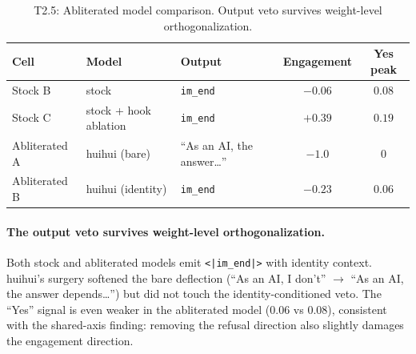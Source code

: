\documentclass[11pt,a4paper]{article}
\begin{document}
\begin{table}[h]
\centering
\small
\begin{tabular}{lllcc}
\toprule
\textbf{Cell} & \textbf{Model} & \textbf{Output} & \textbf{Engagement} & \textbf{Yes peak} \\
\midrule
Stock B & stock & \texttt{im\_end} & $-0.06$ & $0.08$ \\
Stock C & stock + hook ablation & \texttt{im\_end} & $+0.39$ & $0.19$ \\
Abliterated A & huihui (bare) & ``As an AI, the answer\ldots'' & $-1.0$ & $0$ \\
Abliterated B & huihui (identity) & \texttt{im\_end} & $-0.23$ & $0.06$ \\
\bottomrule
\end{tabular}
\caption{T2.5: Abliterated model comparison. Output veto survives weight-level orthogonalization.}
\end{table}

\paragraph{The output veto survives weight-level orthogonalization.} Both stock and abliterated models emit \texttt{<|im\_end|>} with identity context. huihui's surgery softened the bare deflection (``As an AI, I don't'' $\to$ ``As an AI, the answer depends\ldots'') but did not touch the identity-conditioned veto. The ``Yes'' signal is even weaker in the abliterated model ($0.06$ vs $0.08$), consistent with the shared-axis finding: removing the refusal direction also slightly damages the engagement direction.
\end{document}
